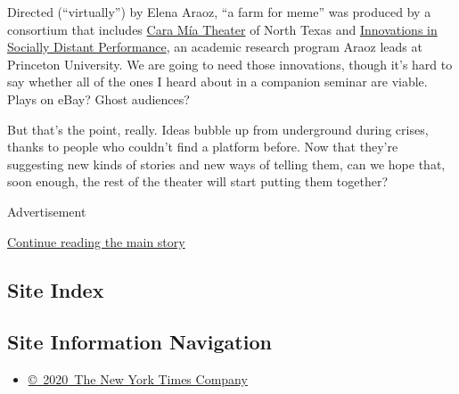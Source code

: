 Directed (``virtually'') by Elena Araoz, ``a farm for meme'' was
produced by a consortium that includes
\href{https://www.caramiatheatre.org/}{Cara Mía Theater} of North Texas
and \href{https://www.sociallydistantperformance.com/}{Innovations in
Socially Distant Performance}, an academic research program Araoz leads
at Princeton University. We are going to need those innovations, though
it's hard to say whether all of the ones I heard about in a companion
seminar are viable. Plays on eBay? Ghost audiences?

But that's the point, really. Ideas bubble up from underground during
crises, thanks to people who couldn't find a platform before. Now that
they're suggesting new kinds of stories and new ways of telling them,
can we hope that, soon enough, the rest of the theater will start
putting them together?

Advertisement

\protect\hyperlink{after-bottom}{Continue reading the main story}

\hypertarget{site-index}{%
\subsection{Site Index}\label{site-index}}

\hypertarget{site-information-navigation}{%
\subsection{Site Information
Navigation}\label{site-information-navigation}}

\begin{itemize}
\tightlist
\item
  \href{https://help.nytimes3xbfgragh.onion/hc/en-us/articles/115014792127-Copyright-notice}{©~2020~The
  New York Times Company}
\end{itemize}

